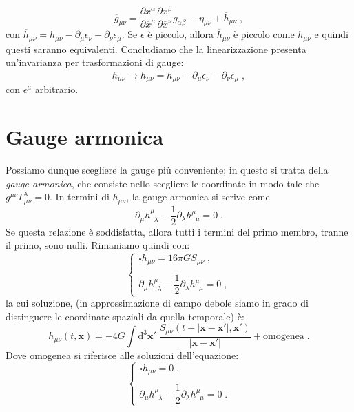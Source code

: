 \documentclass[12pt,a4paper]{report}
\theoremstyle{definition}
\newcommand{\diff}[1][]{\mathrm{d}#1}
\newcommand{\conn}[3]{\Gamma^{#1}_{#2 #3}}
\begin{document}
$$
\overline{g}_{\mu\nu}=\frac{\partial x^{\alpha}}{\partial \overline{x}^{\mu}}\frac{\partial x^{\beta}}{\partial\overline{x}^{\nu}}g_{\alpha\beta}\equiv \eta_{\mu\nu}+\overline{h}_{\mu\nu}\;,
$$
con $\overline{h}_{\mu\nu}=h_{\mu\nu}-\partial_{\mu}\epsilon_{\nu}-\partial_{\nu}\epsilon_{\mu}$. Se $\epsilon$ è piccolo, allora $\overline{h}_{\mu\nu}$ è piccolo come $h_{\mu\nu}$ e quindi questi saranno equivalenti. Concludiamo che la linearizzazione presenta un'invarianza per trasformazioni di gauge:
\begin{equation}
h_{\mu\nu}\longrightarrow \overline{h}_{\mu\nu}=h_{\mu\nu}-\partial_{\mu}\epsilon_{\nu}-\partial_{\nu}\epsilon_{\mu}\;,
\end{equation}
con $\epsilon^{\mu}$ arbitrario.
\section{Gauge armonica}
Possiamo dunque scegliere la gauge più conveniente; in questo si tratta della \emph{gauge armonica}, che consiste nello scegliere le coordinate in modo tale che $g^{\mu\nu}\conn{\lambda}{\mu}{\nu}=0$. In termini di $h_{\mu\nu}$, la gauge armonica si scrive come
\begin{equation}
\partial_{\mu}h^{\mu}_{\;\;\lambda}-\frac{1}{2}\partial_{\lambda}h^{\mu}_{\;\;\mu}=0\;.
\end{equation}
Se questa relazione è soddisfatta, allora tutti i termini del primo membro, tranne il primo, sono nulli. Rimaniamo quindi con:
\begin{equation}
\begin{cases}
\square h_{\mu\nu}=16\pi GS_{\mu\nu}\;, \\
\\
\partial_{\mu}h^{\mu}_{\;\;\lambda}-\dfrac{1}{2}\partial_{\lambda}h^{\mu}_{\;\;\mu}=0\;,
\end{cases}
\end{equation}
la cui soluzione, (in approssimazione di campo debole siamo in grado di distinguere le coordinate spaziali da quella temporale) è:
\begin{equation}
h_{\mu\nu}(t,\mathbf{x})=-4G\int \diff^3{\mathbf{x}'}\;\frac{S_{\mu\nu}(t-|\mathbf{x}-\mathbf{x}'|,\mathbf{x}')}{|\mathbf{x}-\mathbf{x}'|}+\mathrm{omogenea}\;.
\end{equation}
Dove omogenea si riferisce alle soluzioni dell'equazione:
\begin{equation}
\begin{cases}
\square h_{\mu\nu}=0\;, \\
\\
\partial_{\mu}h^{\mu}_{\;\;\lambda}-\dfrac{1}{2}\partial_{\lambda}h^{\mu}_{\;\;\mu}=0\;.
\end{cases}
\end{equation}
\end{document}
